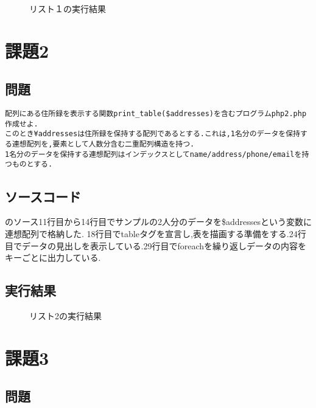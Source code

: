 \documentclass[a4j,10pt]{jsarticle}
\begin{document}
\begin{figure}[H]
  \centering
  \caption{リスト１の実行結果}
  \label{fig:boat1}
\end{figure}

\section{課題2}
\subsection{問題}

\begin{verbatim}
配列にある住所録を表示する関数print_table($addresses)を含むプログラムphp2.php作成せよ.
このとき¥addressesは住所録を保持する配列であるとする.これは,1名分のデータを保持する連想配列を,要素として人数分含む二重配列構造を持つ.
1名分のデータを保持する連想配列はインデックスとしてname/address/phone/emailを持つものとする.
\end{verbatim}
\subsection{ソースコード}



のソース11行目から14行目でサンプルの2人分のデータを\$addressesという変数に連想配列で格納した.
18行目でtableタグを宣言し,表を描画する準備をする.24行目でデータの見出しを表示している.29行目でforeachを繰り返しデータの内容をキーごとに出力している.

\subsection{実行結果}

\begin{figure}[H]
  \centering
  \caption{リスト2の実行結果}
  \label{fig:boat1}
\end{figure}

\section{課題3}

\subsection{問題}
\end{document}
